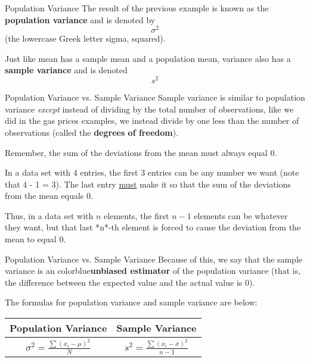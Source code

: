 \documentclass[t]{beamer}
\begin{document}
\begin{frame}{Population Variance}
The result of the previous example is known as the {\color{blue}\textbf{population variance}} and is denoted by \[\sigma^2\] 
(the lowercase Greek letter sigma, squared).	\newline\\	\pause

Just like mean has a sample mean and a population mean, variance also has a {\color{red}\textbf{sample variance}} and is denoted \[s^2\]
\end{frame}

\begin{frame}{Population Variance vs. Sample Variance}
Sample variance is similar to population variance \emph{except} instead of dividing by the total number of observations, like we did in the gas prices examples, we instead divide by one less than the number of observations (called the {\color{blue}\textbf{degrees of freedom}}).	\newline\\	\pause

Remember, the sum of the deviations from the mean must always equal 0. \newline\\	\pause

In a data set with 4 entries, the first 3 entries can be any number we want (note that 4 - 1 = 3). The last entry \underline{must} make it so that the sum of the deviations from the mean equals 0.	\newline\\	\pause

Thus, in a data set with $n$ elements, the first $n-1$ elements can be whatever they want, but that last *n*-th element is forced to cause the deviation from the mean to equal 0.
\end{frame}


\begin{frame}{Population Variance vs. Sample Variance}
Because of this, we say that the sample variance is an {color{blue}\textbf{unbiased estimator}} of the population variance (that is, the difference between the expected value and the actual value is 0).	\newline\\	\pause

The formulas for population variance and sample variance are below:	\newline\\

\begin{center}
\setlength{\extrarowheight}{7pt}
\begin{tabular}{c|c}
\textbf{Population Variance} & \textbf{Sample Variance} \\ \hline
$\sigma^2 = \frac{\sum (x_i-\mu)^2}{N}$	&	$s^2 = \frac{\sum (x_i-\bar{x})^2}{n-1}$
\end{tabular}
\end{center}
\end{frame}
\end{document}
